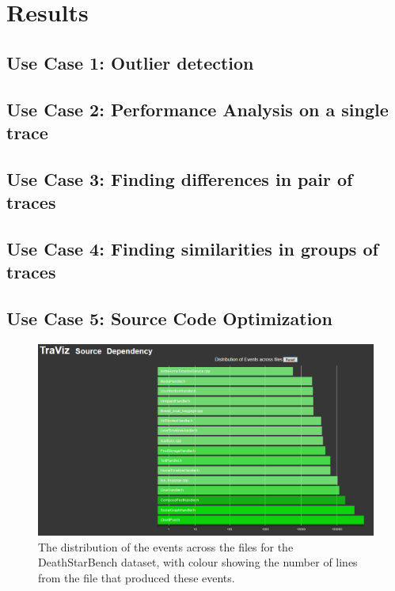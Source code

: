 \section{Results}

\subsection{Use Case 1: Outlier detection}

\subsection{Use Case 2: Performance Analysis on a single trace}

\subsection{Use Case 3: Finding differences in pair of traces}

\subsection{Use Case 4: Finding similarities in groups of traces}

\subsection{Use Case 5: Source Code Optimization}

\begin{figure}
    \centering
    \includegraphics[width=\textwidth]{fig/sourcecode1}
    \caption{The distribution of the events across the files for the DeathStarBench dataset, with colour showing the number of lines from the
    file that produced these events.}
    \label{fig:source1}
\end{figure}

